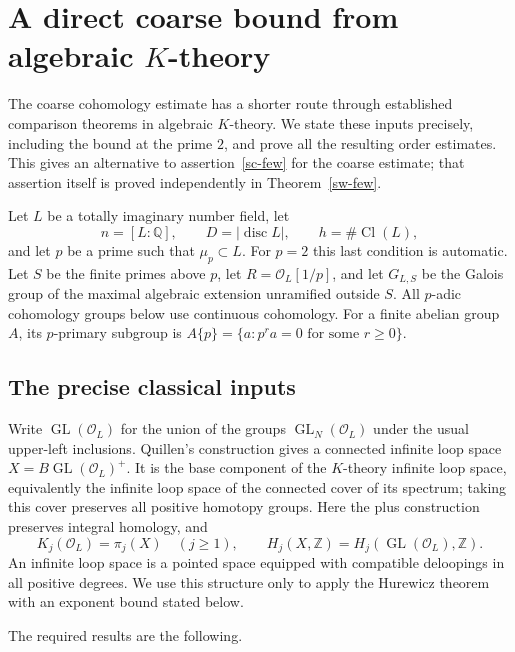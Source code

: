 \section{A direct coarse bound from algebraic \texorpdfstring{$K$}{K}-theory}
\label{kt-section}

The coarse cohomology estimate has a shorter route through established
comparison theorems in algebraic \(K\)-theory.  We state these inputs
precisely, including the bound at the prime \(2\), and prove all the
resulting order estimates.  This gives an alternative to
assertion~\ref{sc-few} for the coarse estimate; that assertion itself
is proved independently in Theorem~\ref{sw-few}.

Let \(L\) be a totally imaginary number field, let
\[
 n=[L:\mathbb Q],\qquad D=|\operatorname{disc}L|,\qquad
 h=\#\operatorname{Cl}(L),
\]
and let \(p\) be a prime such that \(\mu_p\subset L\).
For \(p=2\) this last condition is automatic.
Let \(S\) be the finite primes above \(p\), let
\(R=\mathcal O_L[1/p]\), and let \(G_{L,S}\) be the Galois
group of the maximal algebraic extension unramified outside \(S\).
All \(p\)-adic cohomology groups below use continuous cohomology.
For a finite abelian group \(A\), its \(p\)-primary subgroup is
\(A\{p\}=\{a:p^r a=0\text{ for some }r\ge0\}\).

\subsection{The precise classical inputs}

Write \(\operatorname{GL}(\mathcal O_L)\) for the union of the
groups \(\operatorname{GL}_N(\mathcal O_L)\) under the usual
upper-left inclusions.  Quillen's construction gives a connected
infinite loop space
\(X=B\operatorname{GL}(\mathcal O_L)^+\).
It is the base component of the \(K\)-theory infinite
loop space, equivalently the infinite loop space of the
connected cover of its spectrum; taking this cover
preserves all positive homotopy groups.
Here the plus construction preserves integral homology, and
\[
 K_j(\mathcal O_L)=\pi_j(X)\quad(j\ge1),\qquad
 H_j(X,\mathbb Z)=
 H_j(\operatorname{GL}(\mathcal O_L),\mathbb Z).
 \tag{KT1}
\]
An infinite loop space is a pointed space equipped with
compatible deloopings in all positive degrees.  We use this
structure only to apply the Hurewicz theorem with an exponent
bound stated below.

The required results are the following.

